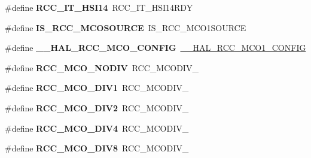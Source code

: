 \begin{DoxyCompactItemize}
\item 
\#define {\bfseries R\+C\+C\+\_\+\+I\+T\+\_\+\+H\+S\+I14}~R\+C\+C\+\_\+\+I\+T\+\_\+\+H\+S\+I14\+R\+DY\hypertarget{group___h_a_l___r_c_c___aliased_ga1d2b2eb3fca0475683b879377c952fbf}{}\label{group___h_a_l___r_c_c___aliased_ga1d2b2eb3fca0475683b879377c952fbf}

\item 
\#define {\bfseries I\+S\+\_\+\+R\+C\+C\+\_\+\+M\+C\+O\+S\+O\+U\+R\+CE}~I\+S\+\_\+\+R\+C\+C\+\_\+\+M\+C\+O1\+S\+O\+U\+R\+CE\hypertarget{group___h_a_l___r_c_c___aliased_ga6ae382b78e1bcec3da6d5ac79b1a5551}{}\label{group___h_a_l___r_c_c___aliased_ga6ae382b78e1bcec3da6d5ac79b1a5551}

\item 
\#define {\bfseries \+\_\+\+\_\+\+H\+A\+L\+\_\+\+R\+C\+C\+\_\+\+M\+C\+O\+\_\+\+C\+O\+N\+F\+IG}~\hyperlink{group___r_c_c_ex___m_c_ox___clock___config_ga7e5f7f1efc92794b6f0e96068240b45e}{\+\_\+\+\_\+\+H\+A\+L\+\_\+\+R\+C\+C\+\_\+\+M\+C\+O1\+\_\+\+C\+O\+N\+F\+IG}\hypertarget{group___h_a_l___r_c_c___aliased_ga4a5994f41cd6798807bf8672ec3dc423}{}\label{group___h_a_l___r_c_c___aliased_ga4a5994f41cd6798807bf8672ec3dc423}

\item 
\#define {\bfseries R\+C\+C\+\_\+\+M\+C\+O\+\_\+\+N\+O\+D\+IV}~R\+C\+C\+\_\+\+M\+C\+O\+D\+I\+V\+\_\hypertarget{group___h_a_l___r_c_c___aliased_ga897ae3aa8cfe31f7b00de98637db45d5}{}\label{group___h_a_l___r_c_c___aliased_ga897ae3aa8cfe31f7b00de98637db45d5}

\item 
\#define {\bfseries R\+C\+C\+\_\+\+M\+C\+O\+\_\+\+D\+I\+V1}~R\+C\+C\+\_\+\+M\+C\+O\+D\+I\+V\+\_\hypertarget{group___h_a_l___r_c_c___aliased_ga411caf05a68e3bd8f14150c14d1f8404}{}\label{group___h_a_l___r_c_c___aliased_ga411caf05a68e3bd8f14150c14d1f8404}

\item 
\#define {\bfseries R\+C\+C\+\_\+\+M\+C\+O\+\_\+\+D\+I\+V2}~R\+C\+C\+\_\+\+M\+C\+O\+D\+I\+V\+\_\hypertarget{group___h_a_l___r_c_c___aliased_ga49e93c717ea6b0916051b085aa595ecb}{}\label{group___h_a_l___r_c_c___aliased_ga49e93c717ea6b0916051b085aa595ecb}

\item 
\#define {\bfseries R\+C\+C\+\_\+\+M\+C\+O\+\_\+\+D\+I\+V4}~R\+C\+C\+\_\+\+M\+C\+O\+D\+I\+V\+\_\hypertarget{group___h_a_l___r_c_c___aliased_gadde6fd8dbc7f1e750aea3903bedffa7d}{}\label{group___h_a_l___r_c_c___aliased_gadde6fd8dbc7f1e750aea3903bedffa7d}

\item 
\#define {\bfseries R\+C\+C\+\_\+\+M\+C\+O\+\_\+\+D\+I\+V8}~R\+C\+C\+\_\+\+M\+C\+O\+D\+I\+V\+\_\hypertarget{group___h_a_l___r_c_c___aliased_ga00b1ed5dae888fa26fcaf66429c617da}{}\label{group___h_a_l___r_c_c___aliased_ga00b1ed5dae888fa26fcaf66429c617da}


\end{DoxyCompactItemize}
